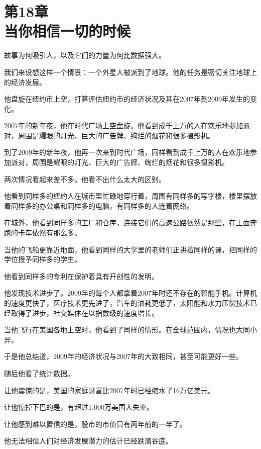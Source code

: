 
\section[第18章\q 当你相信一切的时候]{第18章\\ 当你相信一切的时候}

{\kaishu

故事为何吸引人，以及它们的力量为何比数据强大。

}

我们来设想这样一个情景：一个外星人被派到了地球。他的任务是密切关注地球上的经济发展。

他盘旋在纽约市上空，打算评估纽约市的经济状况及其在2007年到2009年发生的变化。

2007年的新年夜，他在时代广场上空盘旋。他看到成千上万的人在欢乐地参加派对，周围是耀眼的灯光、巨大的广告牌、绚烂的烟花和很多摄影机。

到了2009年的新年夜，他再一次来到时代广场，同样看到成千上万的人在欢乐地参加派对，周围是耀眼的灯光、巨大的广告牌、绚烂的烟花和很多摄影机。

两次情况看起来差不多。他看不出什么太大的区别。

他看到同样多的纽约人在城市里忙碌地穿行着，周围有同样多的写字楼，楼里摆放着同样多的办公桌和同样多的电脑，有同样多的人连着网络。

在城外，他看到同样多的工厂和仓库，连接它们的高速公路依然是那些，在上面奔跑的卡车依然有那么多。

当他的飞船更靠近地面，他看到同样的大学里的老师们正讲着同样的课，把同样的学位授予同样多的学生。

他看到同样多的专利在保护着具有开创性的发明。

他发现技术进步了。2009年的每个人都拿着2007年时还不存在的智能手机。计算机的速度更快了，医疗技术更先进了，汽车的油耗更低了，太阳能和水力压裂技术已经取得了进步，社交媒体在以指数级的速度增长。

当他飞行在美国各地上空时，他看到了同样的情形。在全球范围内，情况也大同小异。

于是他总结道，2009年的经济状况与2007年的大致相同，甚至可能更好一些。

随后他看了统计数据。

让他震惊的是，美国的家庭财富比2007年时已经缩水了16万亿美元。

让他惊掉下巴的是，有超过1,000万美国人失业。

让他感到难以置信的是，股市的市值只有两年前的一半了。

他无法相信人们对经济发展潜力的估计已经跌落谷底。

